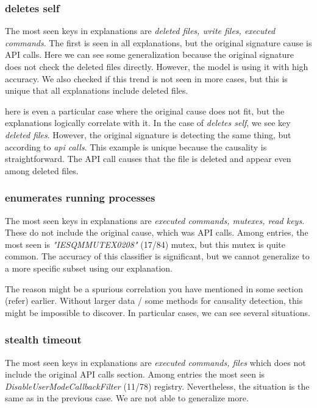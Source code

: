 \subsubsection*{deletes self}
The most seen keys in explanations are \emph{deleted files, write files, executed commands}. The first is seen in all explanations, but the original signature cause is API calls. Here we can see some generalization because the original signature does not check the deleted files directly. However, the model is using it with high accuracy. We also checked if this trend is not seen in more cases, but this is unique that all explanations include deleted files.

here is even a particular case where the original cause does not fit, but the explanations logically correlate with it. In the case of \emph{deletes self}, we see key \emph{deleted files}. However, the original signature is detecting the same thing, but according to \emph{api calls}. This example is unique because the causality is straightforward. The API call causes that the file is deleted and appear even among deleted files. 

\subsubsection*{enumerates running processes}
The most seen keys in explanations are \emph{executed commands, mutexes, read keys}. These do not include the original cause, which was API calls.  Among entries, the most seen is \emph{"IESQMMUTEX0208"} (17/84) mutex, but this mutex is quite common. The accuracy of this classifier is significant, but we cannot generalize to a more specific subset using our explanation.

The reason might be a spurious correlation you have mentioned in some section (refer) earlier. Without larger data / some methods for causality detection, this might be impossible to discover. In particular cases, we can see several situations. 


\subsubsection*{stealth timeout}
The most seen keys in explanations are \emph{executed commands, files} which does not include the original API calls section. Among entries the most seen is \emph{DisableUserModeCallbackFilter} (11/78) registry. Nevertheless, the situation is the same as in the previous case. We are not able to generalize more.

